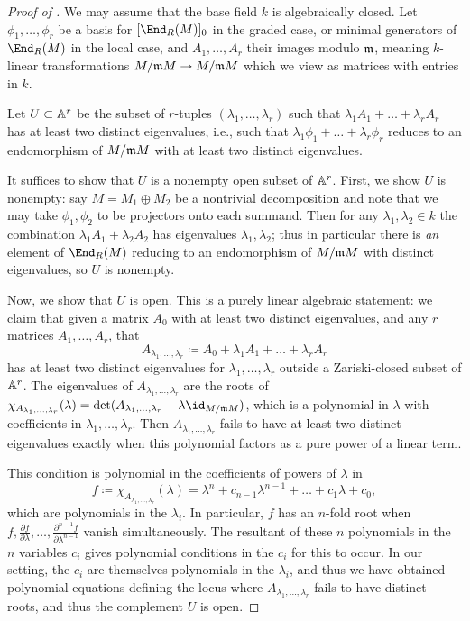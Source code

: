 \documentclass[12pt]{article}
\let\d\partial
\theoremstyle{theorem}
\numberwithin{thm}{section}
\theoremstyle{definition}
\begin{document}
\begin{proof}[Proof of ]
  We may assume that the base field $k$ is algebraically closed.
  Let $\phi_1,\dots,\phi_r$ be a basis for $[\End_R(M)]_0$ in the graded case, or minimal generators of $\End_R(M)$ in the local case, and $A_1,\dots,A_r$ their images modulo $\m$, meaning $k$-linear transformations $M/\m M\to M/\m M$ which we view as matrices with entries in $k$.

  Let $U\subset\AA^r$ be the subset of $r$-tuples $(\lambda_1,\dots,\lambda_r)$ such that $\lambda_1 A_1+\dots+\lambda_r A_r$ has at least two distinct eigenvalues, i.e., such that $\lambda_1\phi_1+\dots+\lambda_r\phi_r$ reduces to an endomorphism of $M/\m M$ with at least two distinct eigenvalues. %

  It suffices to show that $U$ is a nonempty open subset of $\AA^r$. First, we show $U$ is nonempty:
  say $M = M_1\oplus M_2$ be a nontrivial decomposition and note that we may take $\phi_1,\phi_2$ to be projectors onto each summand. Then for any $\lambda_1,\lambda_2\in k$ the combination $\lambda_1 A_1 + \lambda_2 A_2$ has eigenvalues $\lambda_1,\lambda_2$; thus in particular there is \emph{an} element of $\End_R(M)$ reducing to an endomorphism of $M/\m M$ with distinct eigenvalues, so $U$ is nonempty.

  Now, we show that $U$ is open. This is a purely linear algebraic statement: we claim that given a matrix $A_0$ with at least two distinct eigenvalues, and any $r$ matrices $A_1,\dots,A_r$, that
  $$ A_{\lambda_1,\dots,\lambda_r} \coloneqq A_0+\lambda_1 A_1+\dots+\lambda_r A_r $$
  has at least two distinct eigenvalues for $\lambda_1,\dots,\lambda_r$ outside a Zariski-closed subset of $\AA^r$.
  The eigenvalues of $A_{\lambda_1,\dots,\lambda_r}$ are the roots of $\chi_{A_{\lambda_1,\dots,\lambda_r}}(\lambda) = \det(A_{\lambda_1,\dots,\lambda_r}-\lambda \id_{M/\m M})$, which is a polynomial in $\lambda$ with coefficients in $\lambda_1,\dots,\lambda_r$. Then $A_{\lambda_1,\dots,\lambda_r}$ fails to have at least two distinct eigenvalues exactly when this polynomial factors as a pure power of a linear term.

  This condition is polynomial in the coefficients of powers of $\lambda$ in
  \[ f \coloneqq \chi_{A_{\lambda_1,\dots,\lambda_r}}(\lambda) = \lambda^n + c_{n-1} \lambda^{n-1} + \dots + c_1 \lambda + c_0, \]
  which are polynomials in the $\lambda_i$. In particular, $f$ has an $n$-fold root when
  $ f, \frac{\d f}{\d\lambda}, \dots, \frac{\d^{n-1}f}{\d\lambda^{n-1}}$ 
  vanish simultaneously. The resultant of these $n$ polynomials in the $n$ variables $c_i$ gives polynomial conditions in the $c_i$ for this to occur.
  In our setting, the $c_i$ are themselves polynomials in the $\lambda_i$, and thus we have obtained polynomial equations defining the locus where $A_{\lambda_1,\dots,\lambda_r}$ fails to have distinct roots, and thus the complement $U$ is open.
\end{proof}
\end{document}
